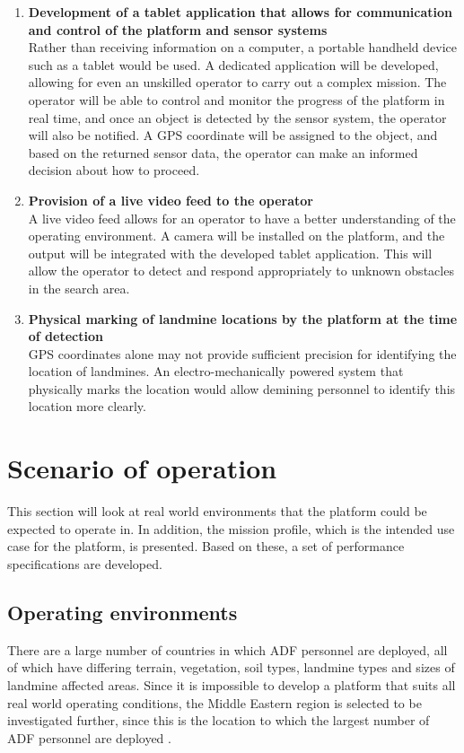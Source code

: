 \documentclass[main.tex]{subfiles}
\begin{document}
\begin{enumerate}
\item \textbf{Development of a tablet application that allows for communication and control of the platform and sensor systems}\\ 
Rather than receiving information on a computer, a portable handheld device such as a tablet would be used. 
A dedicated application will be developed, allowing for even an unskilled operator to carry out a complex mission. 
The operator will be able to control and monitor the progress of the platform in real time, and once an object is detected by the sensor system, the operator will also be notified. 
A GPS coordinate will be assigned to the object, and based on the returned sensor data, the operator can make an informed decision about how to proceed.

\item \textbf{Provision of a live video feed to the operator}\\ 
A live video feed allows for an operator to have a better understanding of the operating environment. 
A camera will be installed on the platform, and the output will be integrated with the developed tablet application. 
This will allow the operator to detect and respond appropriately to unknown obstacles in the search area. 

\item \textbf{Physical marking of landmine locations by the platform at the time of detection}\\ GPS coordinates alone may not provide sufficient precision for identifying the location of landmines. 
An electro-mechanically powered system that physically marks the location would allow demining personnel to identify this location more clearly.

\end{enumerate}

\section{Scenario of operation}
This section will look at real world environments that the platform could be expected to operate in. In addition, the mission profile, which is the intended use case for the platform, is presented. Based on these, a set of performance specifications are developed.  

\subsection{Operating environments}
There are a large number of countries in which ADF personnel are deployed, all of which have differing terrain, vegetation, soil types, landmine types and sizes of landmine affected areas. Since it is impossible to develop a platform that suits all real world operating conditions, the Middle Eastern region is selected to be investigated further, since this is the location to which the largest number of ADF personnel are deployed \parencite{AustralianGovernment2016}. 
\end{document}
